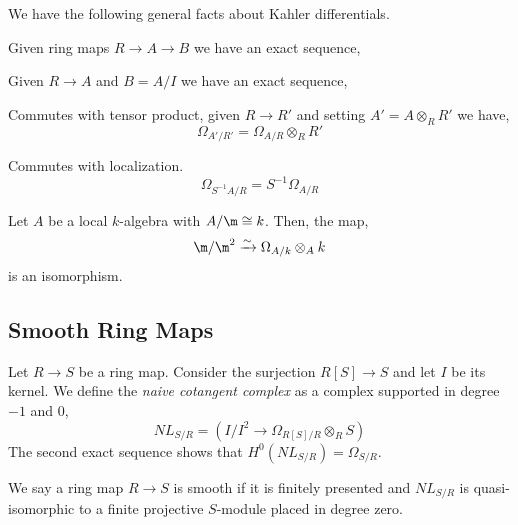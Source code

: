 \documentclass[12pt]{article}
\begin{document}
\begin{prop}
We have the following general facts about Kahler differentials.
\item  Given ring maps $R \to A \to B$ we have an exact sequence,
\begin{center}
\end{center}
\item Given $R \to A$ and $B = A / I$ we have an exact sequence,
\begin{center}
\end{center}
\item Commutes with tensor product, given $R \to R'$ and setting $A' = A \otimes_R R'$ we have,
\[ \Omega_{A'/R'} = \Omega_{A/R} \otimes_R R' \]
\item Commutes with localization.
\[ \Omega_{S^{-1} A/R} = S^{-1} \Omega_{A/R} \]
\end{prop}

\begin{prop}
Let $A$ be a local $k$-algebra with $A/\m \cong k$. Then, the map,
\[ \m / \m^2 \xrightarrow{\sim} \Omega_{A/k} \otimes_A k \]
is an isomorphism.
\end{prop}

\subsection{Smooth Ring Maps}

\begin{defn}
Let $R \to S$ be a ring map. Consider the surjection $R[S] \to S$ and let $I$ be its kernel. We define the \textit{naive cotangent complex} as a complex supported in degree $-1$ and $0$,
\[ NL_{S/R} = \left( I/I^2 \to \Omega_{R[S]/R}  \otimes_R S \right) \]
The second exact sequence shows that $H^0(NL_{S/R}) = \Omega_{S/R}$. 
\end{defn}

\begin{defn}
We say a ring map $R \to S$ is smooth if it is finitely presented and $NL_{S/R}$ is quasi-isomorphic to a finite projective $S$-module placed in degree zero. 
\end{defn}
\end{document}
